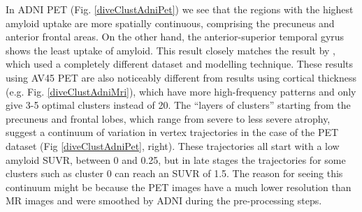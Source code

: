 In ADNI PET (Fig. \ref{diveClustAdniPet}) we see that the regions with the highest amyloid uptake are more spatially continuous, comprising the precuneus and anterior frontal areas. On the other hand, the anterior-superior temporal gyrus shows the least uptake of amyloid. This result closely matches the result by \cite{bilgel2016multivariate}, which used a completely different dataset and modelling technique. These results using AV45 PET are also noticeably different from results using cortical thickness (e.g. Fig. \ref{diveClustAdniMri}), which have more high-frequency patterns and only give 3-5 optimal clusters instead of 20. The “layers of clusters” starting from the precuneus and frontal lobes, which range from severe to less severe atrophy, suggest a continuum of variation in vertex trajectories in the case of the PET dataset (Fig \ref{diveClustAdniPet}, right). These trajectories all start with a low amyloid SUVR, between 0 and 0.25, but in late stages the trajectories for some clusters such as cluster 0 can reach an SUVR of 1.5. The reason for seeing this continuum might be because the PET images have a much lower resolution than MR images and were smoothed by ADNI during the pre-processing steps. 

\newcommand{\scalingFactor}{1.2}
\newcommand{\scalingFactorSubfigBrain}{0.35}

\newcommand{\gradLimLeft}{-1.6}
\newcommand{\gradLimRight}{1.6}

\newcommand{\scalingFactorBrains}{0.75}
\newcommand{\scalingFactorTraj}{1.05}

\newcommand{\typeOfBrainColoring}{atrophyExtent}


